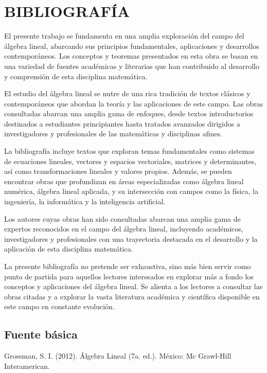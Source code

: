 \chapter*{BIBLIOGRAFÍA}

El presente trabajo se fundamenta en una amplia exploración del campo del álgebra lineal, abarcando sus principios fundamentales, aplicaciones y desarrollos contemporáneos. Los conceptos y teoremas presentados en esta obra se basan en una variedad de fuentes académicas y literarias que han contribuido al desarrollo y comprensión de esta disciplina matemática.

El estudio del álgebra lineal se nutre de una rica tradición de textos clásicos y contemporáneos que abordan la teoría y las aplicaciones de este campo. Las obras consultadas abarcan una amplia gama de enfoques, desde textos introductorios destinados a estudiantes principiantes hasta tratados avanzados dirigidos a investigadores y profesionales de las matemáticas y disciplinas afines.

La bibliografía incluye textos que exploran temas fundamentales como sistemas de ecuaciones lineales, vectores y espacios vectoriales, matrices y determinantes, así como transformaciones lineales y valores propios. Además, se pueden encontrar obras que profundizan en áreas especializadas como álgebra lineal numérica, álgebra lineal aplicada, y su intersección con campos como la física, la ingeniería, la informática y la inteligencia artificial.

Los autores cuyas obras han sido consultadas abarcan una amplia gama de expertos reconocidos en el campo del álgebra lineal, incluyendo académicos, investigadores y profesionales con una trayectoria destacada en el desarrollo y la aplicación de esta disciplina matemática.

La presente bibliografía no pretende ser exhaustiva, sino más bien servir como punto de partida para aquellos lectores interesados en explorar más a fondo los conceptos y aplicaciones del álgebra lineal. Se alienta a los lectores a consultar las obras citadas y a explorar la vasta literatura académica y científica disponible en este campo en constante evolución.

\section*{Fuente básica}

\begin{enumerate}[label={[\arabic*]}]
    \item Grossman, S. I. (2012). Álgebra Lineal (7a. ed.). México: Mc Grawl-Hill Interamerican.
\end{enumerate}

